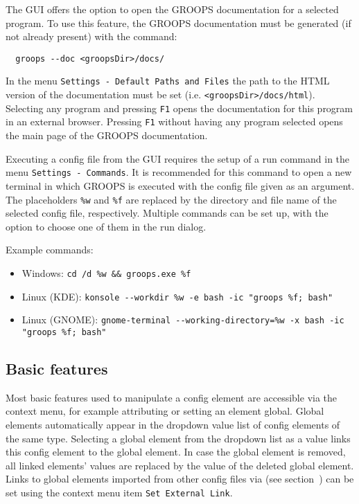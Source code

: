 The GUI offers the option to open the GROOPS documentation for a selected program. To use this feature,
the GROOPS documentation must be generated (if not already present) with the command:
\begin{verbatim}
  groops --doc <groopsDir>/docs/
\end{verbatim}
In the menu \verb|Settings - Default Paths and Files| the path to the HTML version of the documentation must be set (i.e. \verb|<groopsDir>/docs/html|).
Selecting any program and pressing \verb|F1| opens the documentation for this program in an external browser.
Pressing \verb|F1| without having any program selected opens the main page of the GROOPS documentation.

Executing a config file from the GUI requires the setup of a run command in the menu \verb|Settings - Commands|.
It is recommended for this command to open a new terminal in which GROOPS is executed with the config file given as an argument.
The placeholders \verb|%w| and \verb|%f| are replaced by the directory and file name of the selected config file, respectively.
Multiple commands can be set up, with the option to choose one of them in the run dialog.

Example commands:
\begin{itemize}
	\item Windows: \verb|cd /d %w && groops.exe %f|
	\item Linux (KDE): \verb|konsole --workdir %w -e bash -ic "groops %f; bash"|
	\item Linux (GNOME): \verb|gnome-terminal --working-directory=%w -x bash -ic "groops %f; bash"|
\end{itemize}

\subsection{Basic features}

Most basic features used to manipulate a config element are accessible via the context menu,
for example attributing  or setting an element global.
Global elements automatically appear in the dropdown value list of config elements of the same type.
Selecting a global element from the dropdown list as a value links this config element to the global element.
In case the global element is removed, all linked elements' values are replaced by the value of the deleted global element.
Links to global elements imported from other config files via 
(see section~) can be set using the context menu item \verb|Set External Link|.


